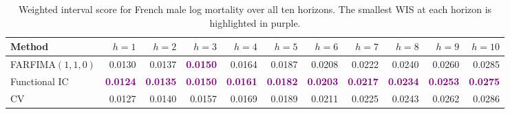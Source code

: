 \begin{table}[!htb]
\centering
\begingroup\fontsize{7}{9}\selectfont
\setlength{\tabcolsep}{2.5pt}
\caption{Weighted interval score for French male log mortality over all ten horizons. The smallest WIS at each horizon is highlighted in purple.}
\label{tab:emp-male-mortality-wis}
\begin{tabular}{lrrrrrrrrrr}
\toprule
Method & $h=1$ & $h=2$ & $h=3$ & $h=4$ & $h=5$ & $h=6$ & $h=7$ & $h=8$ & $h=9$ & $h=10$ \\
\midrule
FARFIMA$(1,1,0)$ & 0.0130 & 0.0137 & \textcolor{purple}{\textbf{0.0150}} & 0.0164 & 0.0187 & 0.0208 & 0.0222 & 0.0240 & 0.0260 & 0.0285 \\
Functional IC & \textcolor{purple}{\textbf{0.0124}} & \textcolor{purple}{\textbf{0.0135}} & \textcolor{purple}{\textbf{0.0150}} & \textcolor{purple}{\textbf{0.0161}} & \textcolor{purple}{\textbf{0.0182}} & \textcolor{purple}{\textbf{0.0203}} & \textcolor{purple}{\textbf{0.0217}} & \textcolor{purple}{\textbf{0.0234}} & \textcolor{purple}{\textbf{0.0253}} & \textcolor{purple}{\textbf{0.0275}} \\
CV & 0.0127 & 0.0140 & 0.0157 & 0.0169 & 0.0189 & 0.0211 & 0.0225 & 0.0243 & 0.0262 & 0.0286 \\
\bottomrule
\end{tabular}
\endgroup
\end{table}

